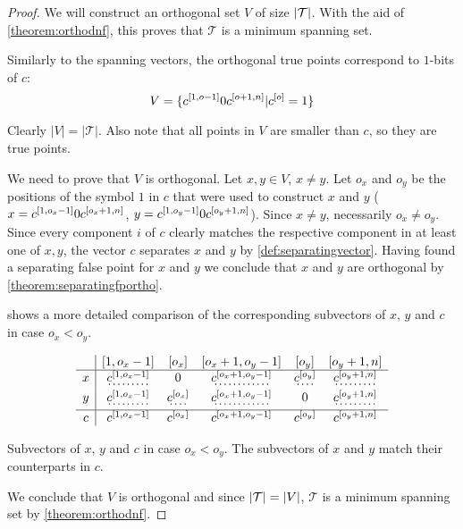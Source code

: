 \begin{proof}
We will construct an orthogonal set $V$
of size $\lvert\mathcal{T}\rvert$.
With the aid of \cref{theorem:orthodnf},
this proves that $\mathcal{T}$ is a minimum spanning set.

Similarly to the spanning vectors,
the orthogonal true points correspond to $1$-bits of $c$:
$$
V =
\{c^{[1, o - 1]} 0 c^{[o + 1, n]}
| c^{[o]} = 1\}
$$

Clearly $|V| = |\mathcal{T}|$.
Also note that all points in $V$ are smaller than $c$,
so they are true points.

We need to prove that $V$ is orthogonal.
Let $x, y \in V$, $x \neq y$.
Let $o_x$ and $o_y$ be the positions of the symbol $1$
in $c$
that were used to construct $x$ and $y$
($x = c^{[1, o_x - 1]} 0 c^{[o_x + 1, n]}$,
$y = c^{[1, o_y - 1]} 0 c^{[o_y + 1, n]}$).
Since $x \neq y$, necessarily $o_x \neq o_y$.
Since every component $i$ of $c$
clearly matches the respective component
in at least one of $x, y$,
the vector $c$ separates $x$ and $y$
by \cref{def:separatingvector}.
Having found a separating false point for $x$ and $y$
we conclude that $x$ and $y$ are orthogonal
by \cref{theorem:separatingfportho}.

shows a more detailed comparison
of the corresponding subvectors of $x$, $y$ and $c$
in case $o_x < o_y$.

\newcommand{\emphvector}[1]{\dotuline{#1}}

\begin{table}[h]
\centering
$$\begin{array}{c|ccccc}
& \interval{1}{o_x - 1} & [o_x]
& \interval{o_x + 1}{o_y - 1} & [o_y]
& \interval{o_y + 1}{n} \\
\hline
x
& \emphvector{\bits{c}{1}{o_x - 1}}
& 0
& \emphvector{\bits{c}{o_x + 1}{o_y - 1}}
& \emphvector{\bit{c}{o_y}}
& \emphvector{\bits{c}{o_y + 1}{n}} \\
y
& \emphvector{\bits{c}{1}{o_x - 1}}
& \emphvector{\bit{c}{o_x}}
& \emphvector{\bits{c}{o_x + 1}{o_y - 1}}
& 0
& \emphvector{\bits{c}{o_y + 1}{n}} \\
\hline
c
& \bits{c}{1}{o_x - 1}
& \bit{c}{o_x}
& \bits{c}{o_x + 1}{o_y - 1}
& \bit{c}{o_y}
& \bits{c}{o_y + 1}{n}
\end{array}$$
\caption[Subvectors of $x$, $y$ and $c$
in case $o_x < o_y$]
{Subvectors of $x$, $y$ and $c$
in case $o_x < o_y$.
The \emphvector{emphasized} subvectors of $x$ and $y$
match their counterparts in $c$.}
\label{tab:xyc}
\end{table}


We conclude that $V$ is orthogonal
and since $\lvert\mathcal{T}\rvert = \lvert V\rvert$,
$\mathcal{T}$ is a minimum spanning set
by \cref{theorem:orthodnf}.
\end{proof}


